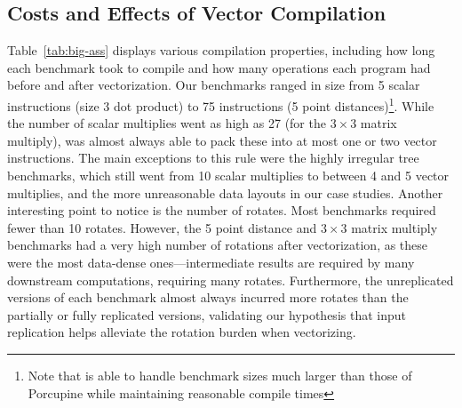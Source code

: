 \subsection{Costs and Effects of Vector Compilation}\label{sec:compilation-stuff}
Table~\ref{tab:big-ass} displays various compilation properties, including how long each benchmark took to compile and how many operations each program had before and after vectorization.
Our benchmarks ranged in size from 5 scalar instructions (size 3 dot product) to 75 instructions (5 point distances)\footnote{Note that \system is able to handle benchmark sizes much larger than those of Porcupine \cite{Porcupine} while maintaining reasonable compile times}.
While the number of scalar multiplies went as high as 27 (for the $3\times 3$ matrix multiply), \system was almost always able to pack these into at most one or two vector instructions.
The main exceptions to this rule were the highly irregular tree benchmarks, which still went from 10 scalar multiplies to between 4 and 5 vector multiplies, and the more unreasonable data layouts in our case studies.
Another interesting point to notice is the number of rotates. Most benchmarks required fewer than 10 rotates. However, the 5 point distance and $3\times 3$ matrix multiply benchmarks had a very high number of rotations after vectorization, as these were the most data-dense ones---intermediate results are required by many downstream computations, requiring many rotates.
Furthermore, the unreplicated versions of each benchmark almost always incurred more rotates than the partially or fully replicated versions, validating our hypothesis that input replication helps alleviate the rotation burden when vectorizing.



